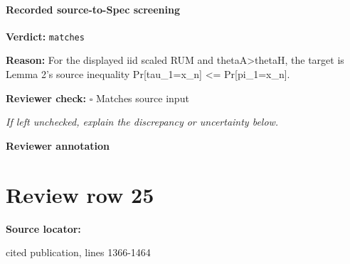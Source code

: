 \documentclass[10pt]{article}
\newcommand{\reviewerbox}{%
  \par\noindent\fbox{\parbox{0.96\linewidth}{\rule{0pt}{0.38in}}}\par
}
\newcommand{\reviewmatch}[1]{%
  \par\noindent\textbf{Reviewer check:} $\square$\; #1\par
  \noindent\emph{If left unchecked, explain the discrepancy or uncertainty below.}\par
}
\begin{document}
\paragraph{Recorded source-to-Spec screening}
\textbf{Verdict:} \texttt{matches}
\\
{\raggedright
\textbf{Reason:} For the displayed iid scaled RUM and thetaA>thetaH, the target is Lemma 2's source inequality Pr[tau\_\allowbreak{}1=x\_\allowbreak{}n] <= Pr[pi\_\allowbreak{}1=x\_\allowbreak{}n].\allowbreak{}
\par}
\reviewmatch{Matches source input}
\noindent\textbf{Reviewer annotation}\par
\reviewerbox
\clearpage
\hypertarget{source-claim-a48d69bf76046da3}{}
\section*{Review row 25}
\textbf{Source locator:} {\footnotesize\raggedright cited publication, lines 1366-\allowbreak{}1464\par}
\end{document}
